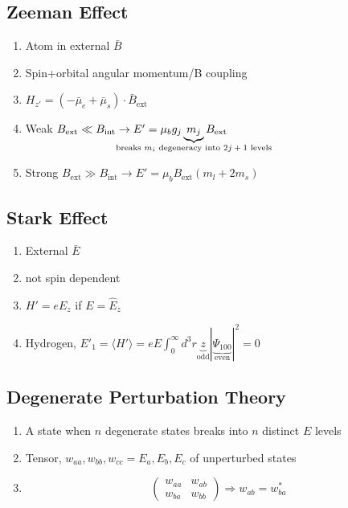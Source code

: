 \documentclass[10pt,a4paper]{article}
\begin{document}
\subsection{Zeeman Effect}
\begin{enumerate}
    \item Atom in external $\bar{B}$ 
    \item Spin+orbital angular momentum/B coupling\\
    \item $H_{z'} = (-\bar{\mu}_e + \bar{\mu}_s ) \cdot \bar{B}_{\textrm{ext}}$
    \item Weak $B_{\textrm{ext}} \ll B_{\textrm{int}} \rightarrow E' = \mu_b g_j \underbrace{m_j}_{\mathclap{\textrm{breaks $m_i$ degeneracy into $2j+1$ levels}}} B_{\textrm{ext}}$
    \item Strong $B_{\textrm{ext}} \gg B_{\textrm{int}} \rightarrow E' = \mu_b B_{\textrm{ext}}(m_l + 2m_s)$
\end{enumerate} 

\subsection{Stark Effect}
\begin{enumerate}
    \item External $\bar{E}$
    \item not spin dependent
    \item $H' = eE_z$ if $E= \hat{E}_z$
    \item Hydrogen, $E'_1 = \langle H' \rangle = eE\int_0^\infty d^3 r \underbrace{z}_{\textrm{odd}} | \underbrace{\Psi_{100}}_{\textrm{even}}|^2 = 0 $
\end{enumerate}

\subsection{Degenerate Perturbation Theory}
\begin{enumerate}
    \item A state when $n$ degenerate states breaks into $n$ distinct $E$ levels
    \item Tensor, $w_{aa},w_{bb},w_{cc} = E_a,E_b,E_c$ of unperturbed states
    \item \[ \left( \begin{array}{cc}
w_{aa} & w_{ab}  \\
w_{ba} & w_{bb}  \end{array} \right) \Rightarrow w_{ab} = w_{ba}^*\] 
\end{enumerate}
\end{document}
